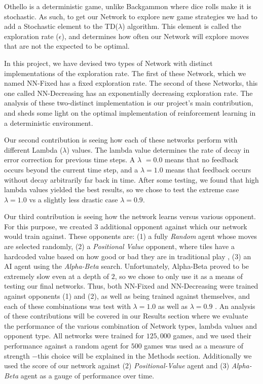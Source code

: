\documentclass{sig-alternate-05-2015}
\begin{document}
Othello is a deterministic game, unlike Backgammon where dice rolls make it is stochastic. As such, to get our Network to explore new game strategies we had to add a Stochastic element to the TD(\(\lambda\)) algorithm. This element is called the exploration rate (\(\epsilon\)), and determines how often our Network will explore moves that are not the expected to be optimal.

In this project, we have devised two types of Network with distinct implementations of the exploration rate. The first of these Network, which we named NN-Fixed has a fixed exploration rate. The second of these Networks, this one called NN-Decreasing has an exponentially decreasing exploration rate. The analysis of these two-distinct implementation is our project's main contribution, and sheds some light on the optimal implementation of reinforcement learning in a deterministic environment.

Our second contribution is seeing how each of these networks perform with different Lambda (\(\lambda\)) values. The lambda value determines the rate of decay in error correction for previous time steps. A \(\lambda\) $= 0.0$ means that no feedback occurs beyond the current time step, and a $\lambda  = 1.0$ means that feedback occurs without decay arbitrarily far back in time. After some testing, we found that high lambda values yielded the best results, so we chose to test the extreme case $\lambda  = 1.0$ vs a slightly less drastic case $\lambda  = 0.9$.

Our third contribution is seeing how the network learns versus various opponent. For this purpose, we created 3 additional opponent against which our network would train against. These opponents are: (1) a fully \emph{Random} agent whose moves are selected randomly, (2) a \emph{Positional Value} opponent, where tiles have a hardcoded value based on how good or bad they are in traditional play \cite{van2013reinforcement}, (3) an AI agent using the \emph{Alpha-Beta} search. Unfortunately, Alpha-Beta proved to be extremely slow even at a depth of $2$, so we chose to only use it as a means of testing our final networks. Thus, both NN-Fixed and NN-Decreasing were trained against opponents (1) and (2), as well as being trained against themselves, and each of these combinations was test with $\lambda  = 1.0$ as well as $\lambda  = 0.9$ . An analysis of these contributions will be covered in our Results section where we evaluate the performance of the various combination of Network types, lambda values and opponent type. All networks were trained for $125,000$ games, and we used their performance against a random agent for $500$ games was used as a measure of strength $-$this choice will be explained in the Methods section. Additionally we used the score of our network against (2) \emph{Positional-Value} agent and (3) \emph{Alpha-Beta} agent as a gauge of performance over time. 
\end{document}
